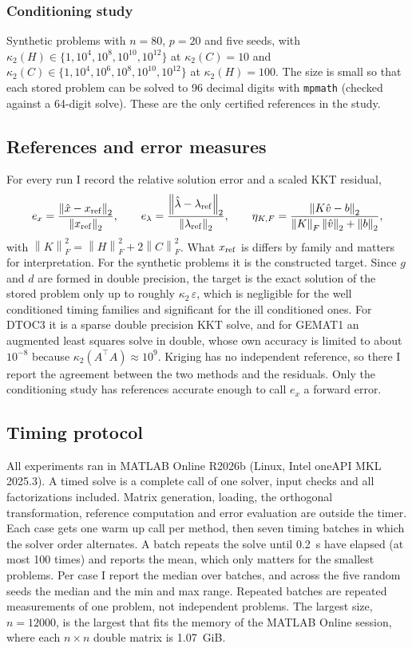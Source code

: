 \documentclass[10pt]{article}
\newcommand{\norm}[1]{\left\lVert #1\right\rVert}
\newcommand{\kap}{\kappa_2}
\begin{document}
\subsubsection*{Conditioning study} Synthetic problems with $n=80$, $p=20$ and five
seeds, with $\kap(H)\in\{1,10^4,10^8,10^{10},10^{12}\}$ at $\kap(C)=10$ and
$\kap(C)\in\{1,10^4,10^6,10^8,10^{10},10^{12}\}$ at $\kap(H)=100$. The size is small so
that each stored problem can be solved to 96 decimal digits with \texttt{mpmath}
(checked against a 64-digit solve). These are the only certified references in the
study.

\subsection{References and error measures}

For every run I record the relative solution error and a scaled KKT residual,
\begin{equation}
e_x=\frac{\norm{\hat x-x_{\rm ref}}_2}{\norm{x_{\rm ref}}_2},\qquad
e_\lambda=\frac{\norm{\hat\lambda-\lambda_{\rm ref}}_2}{\norm{\lambda_{\rm ref}}_2},\qquad
\eta_{K,F}=\frac{\norm{K\hat v-b}_2}{\norm K_F\norm{\hat v}_2+\norm b_2},
\end{equation}
with $\norm K_F^2=\norm H_F^2+2\norm C_F^2$. What $x_{\rm ref}$ is differs by family and
matters for interpretation. For the synthetic problems it is the constructed target.
Since $g$ and $d$ are formed in double precision, the target is the exact solution of the
stored problem only up to roughly $\kap\,\varepsilon$, which is negligible for the
well conditioned timing families and significant for the ill conditioned ones. For DTOC3
it is a sparse double precision KKT solve, and for GEMAT1 an augmented least squares
solve in double, whose own accuracy is limited to about $10^{-8}$ because
$\kap(A^\top A)\approx10^9$. Kriging has no independent reference, so there I report the
agreement between the two methods and the residuals. Only the conditioning study has references accurate enough to
call $e_x$ a forward error.

\subsection{Timing protocol}

All experiments ran in MATLAB Online R2026b (Linux, Intel oneAPI MKL 2025.3). A timed
solve is a complete call of one solver, input checks and all factorizations included.
Matrix generation, loading, the orthogonal transformation, reference computation and
error evaluation are outside the timer. Each case gets one warm up call per method, then
seven timing batches in which the solver order alternates. A batch repeats the solve
until 0.2~s have elapsed (at most 100 times) and reports the mean, which only matters for
the smallest problems. Per case I report the median over batches, and across the five
random seeds the median and the min and max range. Repeated batches are repeated
measurements of one problem, not independent problems. The largest size, $n=12000$, is
the largest that fits the memory of the MATLAB Online session, where each $n\times n$
double matrix is 1.07~GiB.
\end{document}
